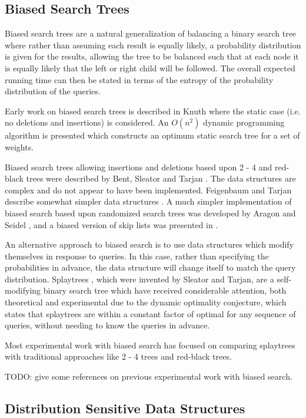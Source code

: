\documentclass[mcs]{scsthesis}
\begin{document}
\subsection{Biased Search Trees}

Biased search trees are a natural generalization of balancing a binary search
tree where rather than assuming each result is equally likely, a probability
distribution is given for the results, allowing the tree to be balanced such
that at each node it is equally likely that the left or right child will be
followed.  The overall expected running time can then be stated in terms of the
entropy of the probability distribution of the queries.

Early work on biased search trees is described in Knuth \cite{knuth} where
the static case (i.e. no deletions and insertions) is considered.  An \(O(n^2)\)
dynamic programming algorithm is presented which constructs an optimum static
search tree for a set of weights.

Biased search trees allowing insertions and deletions based upon 2 - 4 and
red-black trees were described by Bent, Sleator and Tarjan \cite{bst}.  The
data structures are complex and do not appear to have been implemented.
Feigenbaum and Tarjan describe somewhat simpler data structures \cite{bst2}. A
much simpler implementation of biased search based upon randomized search trees
was developed by Aragon and Seidel \cite{treap}, and a biased version of skip
lists \cite{skiplist} was presented in \cite{bsl2}.

An alternative approach to biased search is to use data structures which
modify themselves in response to queries.  In this case, rather than specifying
the probabilities in advance, the data structure will change itself to match
the query distribution.  Splaytrees \cite{splaytree}, which were invented by
Sleator and Tarjan, are a self-modifying binary search tree which have
received considerable attention, both theoretical and experimental due to the
dynamic optimality conjecture, which states that splaytrees are within a
constant factor of optimal for any sequence of queries, without needing to
know the queries in advance.

Most experimental work with biased search has focused on comparing splaytrees
with traditional approaches like 2 - 4 trees and red-black trees.

TODO: give some references on previous experimental work with biased search.

\subsection{Distribution Sensitive Data Structures}
\end{document}
